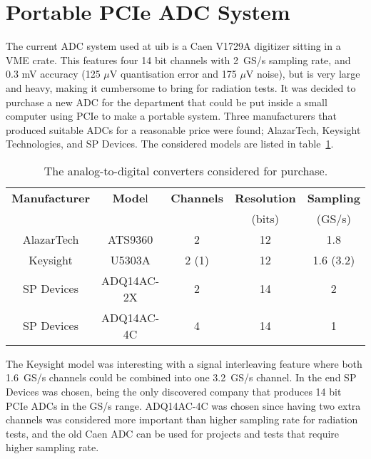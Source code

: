\documentclass[../main/thesis.tex]{subfiles}
\begin{document}

\section{Portable PCIe ADC System}
\label{e-adc}
The current \gls{ADC} system used at \gls{uib} is a Caen V1729A digitizer sitting in a VME crate. This features four 14 bit channels with 2~GS/s sampling rate, and 0.3 mV accuracy (125 $\mu$V quantisation error and 175 $\mu$V noise), but is very large and heavy, making it cumbersome to bring for radiation tests. It was decided to purchase a new \gls{ADC} for the department that could be put inside a small computer using \gls{PCIe} to make a portable system. Three manufacturers that produced suitable \gls{ADC}s for a reasonable price were found; AlazarTech, Keysight Technologies, and SP Devices. The considered models are listed in table~\ref{tab-adc}. 

\begin{table}[h]
\begin{center}
	\caption{The analog-to-digital converters considered for purchase.}
	\label{tab-adc}
	\begin{tabular}{ccccc}%
		\toprule %
		\textbf{Manufacturer} & \textbf{Mode}l & \textbf{Channels} & \textbf{Resolution} & \textbf{Sampling} \\ 
		 & & & (bits) & (GS/s) \\ \midrule%
		AlazarTech & ATS9360 & 2 & 12 & 1.8 \\ %
		Keysight & U5303A & 2 (1) & 12 & 1.6 (3.2) \\ %
		SP Devices & ADQ14AC-2X & 2 & 14 & 2 \\ %
		SP Devices & ADQ14AC-4C & 4 & 14 & 1 \\ \bottomrule%
	\end{tabular}
\end{center}
\end{table}

The Keysight model was interesting with a signal interleaving feature where both 1.6~GS/s channels could be combined into one 3.2~GS/s channel. In the end SP Devices was chosen, being the only discovered company that produces 14 bit \gls{PCIe} \gls{ADC}s in the GS/s range. ADQ14AC-4C was chosen since having two extra channels was considered more important than higher sampling rate for radiation tests, and the old Caen \gls{ADC} can be used for projects and tests that require higher sampling rate. 
\end{document}
